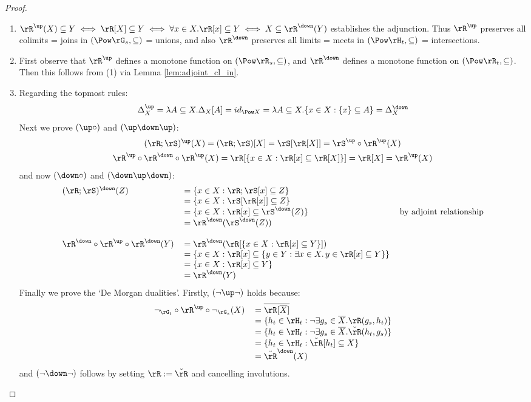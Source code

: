 \documentclass{article}
\begin{document}
\begin{proof}
\item
\begin{enumerate}
\item
$\rR^\up(X) \subseteq Y \iff \rR[X] \subseteq Y \iff \forall x \in X. \rR[x] \subseteq Y \iff X \subseteq \rR^\down(Y)$ establishes the adjunction. Thus $\rR^\up$ preserves all colimits = joins in $(\Pow \rG_s,\subseteq)$ = unions, and also $\rR^\down$ preserves all limits = meets in $(\Pow \rH_t,\subseteq)$ = intersections.

\item
First observe that $\rR^\up$ defines a monotone function on $(\Pow \rR_s,\subseteq)$, and $\rR^\down$ defines a monotone function on $(\Pow \rR_t,\subseteq)$. Then this follows from (1) via Lemma \ref{lem:adjoint_cl_in}.

\item
Regarding the topmost rules:
\[
\Delta_X^\up 
= \lambda A \subseteq X.\Delta_X[A] 
= id_{\Pow X}
= \lambda A \subseteq X.\{ x \in X : \{x\} \subseteq A \}
= \Delta_X^\down
\]
Next we prove $(\up\circ)$ and $(\up\down\up)$:
\[
\begin{tabular}{c}
$(\rR ; \rS)^\up(X) = (\rR ; \rS)[X] = \rS[\rR[X]] = \rS^\up \circ \rR^\up (X)$
\\[1ex]
$\rR^\up \circ \rR^\down \circ \rR^\up(X)
= \rR[\{ x \in X : \rR[x] \subseteq \rR[X] \}]
= \rR[X]
= \rR^\up(X)$
\end{tabular}
\]
and now $(\down\circ)$ and $(\down\up\down)$:
\[
\begin{tabular}{lll}
$(\rR ; \rS)^\down(Z)$
& $= \{ x \in X : \rR;\rS[x] \subseteq Z \}$
\\&
$= \{ x \in X : \rS[\rR[x]] \subseteq Z \} $
\\&
$= \{ x \in X : \rR[x] \subseteq \rS^\down(Z) \}$
& by adjoint relationship
\\&
$= \rR^\down(\rS^\down(Z))$
\\
\\
$\rR^\down \circ \rR^\up \circ \rR^\down(Y)$
&
$= \rR^\down(\rR[\{x \in X : \rR[x] \subseteq Y \}])$
\\&
$= \{ x \in X : \rR[x] \subseteq \{ y \in Y : \exists x \in X.\, y \in \rR[x] \subseteq Y \} \}$
\\&
$= \{ x \in X : \rR[x] \subseteq Y  \}$
\\&
$= \rR^\down(Y)$
\end{tabular}
\]
Finally we prove the `De Morgan dualities'. Firstly, $(\neg\up\neg)$  holds because:
\[
\begin{tabular}{lll}
$\neg_{\rG_t} \circ \rR^\up \circ \neg_{\rG_s}(X)$
&
$= \overline{\rR[\overline{X}]}$
\\&
$= \{ h_t \in \rH_t : \neg\exists g_s \in \overline{X}.\rR(g_s,h_t) \}$
\\&
$= \{ h_t \in \rH_t : \neg\exists g_s \in \overline{X}.\breve{\rR}(h_t,g_s) \}$
\\&
$= \{ h_t \in \rH_t : \breve{\rR}[h_t] \subseteq X \}$
\\&
$= \breve{\rR}^\down(X)$
\end{tabular}
\]
and $(\neg\down\neg)$ follows by setting $\rR := \breve{\rR}$ and cancelling involutions.


\end{enumerate}
\end{proof}
\end{document}

